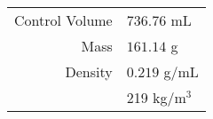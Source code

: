 \begin{tabular}{r | l}
Control Volume & \(736.76\) mL\\
Mass & \(161.14\) g\\
Density & \(0.219\) g/mL\\
& 219 kg/\(\textrm{m}^3\)\\
\end{tabular}
